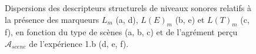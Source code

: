 \begin{figure}[t]
        \caption{Dispersions des descripteurs structurels de niveaux sonores relatifs à la présence des marqueurs $L_m$ (a, d), $L(E)_m$ (b, e) et $L(T)_m$ (c, f), en fonction du type de scènes (a, b, c) et de l'agrément perçu $\mathcal{A}_{scene}$ de l'expérience 1.b (d, e, f).}\label{fig:soundlevelMarker}
\end{figure}


